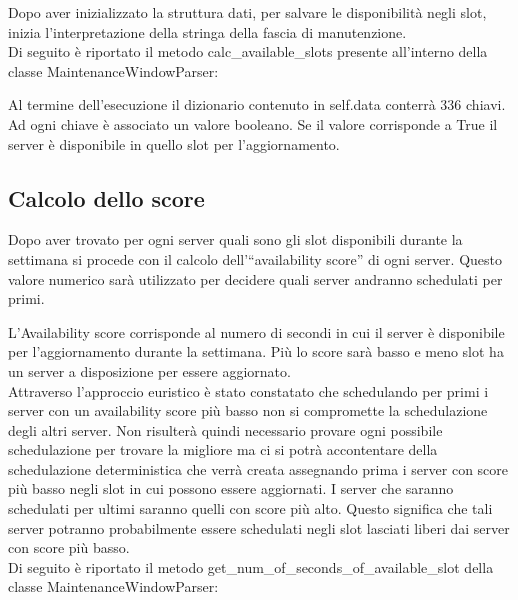 Dopo aver inizializzato la struttura dati, per salvare le disponibilità negli 
slot, inizia l’interpretazione della stringa della fascia di manutenzione.\\

Di seguito è riportato il metodo calc\_available\_slots presente all'interno della classe MaintenanceWindowParser:



Al termine dell’esecuzione il dizionario contenuto in self.data conterrà 336 chiavi. 
Ad ogni chiave è associato un valore booleano. Se il valore corrisponde a True il 
server è disponibile in quello slot per l’aggiornamento.


\subsection{Calcolo dello score}
Dopo aver trovato per ogni server quali sono gli slot disponibili durante la 
settimana si procede con il calcolo dell’“availability score” di ogni server. 
Questo valore numerico sarà utilizzato per decidere quali server andranno schedulati per primi.

L'Availability score corrisponde al numero di secondi in cui il server è disponibile 
per l’aggiornamento durante la settimana.
Più lo score sarà basso e meno slot ha un server a disposizione per essere aggiornato.\\

Attraverso l’approccio euristico è stato constatato che schedulando per primi i 
server con un availability score più basso non si compromette la schedulazione degli 
altri server. Non risulterà quindi necessario provare ogni possibile schedulazione 
per trovare la migliore ma ci si potrà accontentare della schedulazione deterministica 
che verrà creata assegnando prima i server con score più basso negli slot in cui 
possono essere aggiornati.
I server che saranno schedulati per ultimi saranno quelli con score più alto.
Questo significa che tali server potranno probabilmente essere schedulati 
negli slot lasciati liberi dai server con score più basso.\\


Di seguito è riportato il metodo get\_num\_of\_seconds\_of\_available\_slot della 
classe MaintenanceWindowParser:





